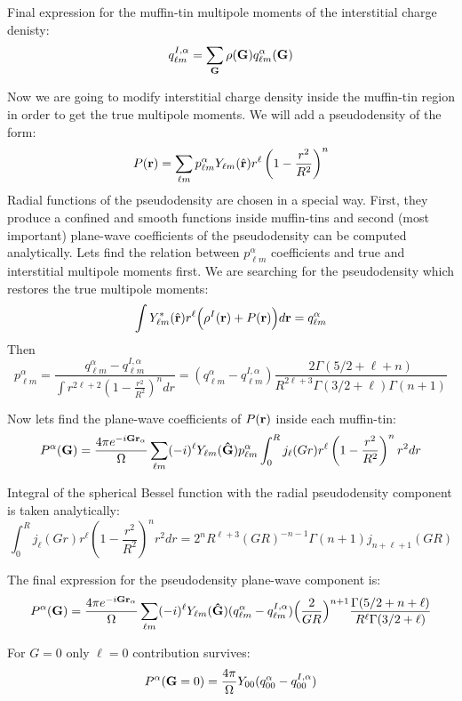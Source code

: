 Final expression for the muffin-\/tin multipole moments of the interstitial charge denisty\+: \[ q_{\ell m}^{I,\alpha} = \sum_{\bf G}\rho({\bf G}) q_{\ell m}^{\alpha}({\bf G}) \]

Now we are going to modify interstitial charge density inside the muffin-\/tin region in order to get the true multipole moments. We will add a pseudodensity of the form\+: \[ P({\bf r}) = \sum_{\ell m} p_{\ell m}^{\alpha} Y_{\ell m}(\hat {\bf r}) r^{\ell} \left(1-\frac{r^2}{R^2}\right)^n \] Radial functions of the pseudodensity are chosen in a special way. First, they produce a confined and smooth functions inside muffin-\/tins and second (most important) plane-\/wave coefficients of the pseudodensity can be computed analytically. Let\textquotesingle{}s find the relation between $ p_{\ell m}^{\alpha} $ coefficients and true and interstitial multipole moments first. We are searching for the pseudodensity which restores the true multipole moments\+: \[ \int Y_{\ell m}^{*}(\hat {\bf r}) r^{\ell} \Big(\rho^{I}({\bf r}) + P({\bf r})\Big) d {\bf r} = q_{\ell m}^{\alpha} \] Then \[ p_{\ell m}^{\alpha} = \frac{q_{\ell m}^{\alpha} - q_{\ell m}^{I,\alpha}} {\int r^{2 \ell + 2} \left(1-\frac{r^2}{R^2}\right)^n dr} = (q_{\ell m}^{\alpha} - q_{\ell m}^{I,\alpha}) \frac{2 \Gamma(5/2 + \ell + n)}{R^{2\ell + 3}\Gamma(3/2 + \ell) \Gamma(n + 1)} \]

Now let\textquotesingle{}s find the plane-\/wave coefficients of $ P({\bf r}) $ inside each muffin-\/tin\+: \[ P^{\alpha}({\bf G}) = \frac{4\pi e^{-i{\bf G r}_{\alpha}}}{\Omega} \sum_{\ell m} (-i)^{\ell} Y_{\ell m}({\bf \hat G}) p_{\ell m}^{\alpha} \int_{0}^{R} j_{\ell}(G r) r^{\ell} \left(1-\frac{r^2}{R^2}\right)^n r^2 dr \]

Integral of the spherical Bessel function with the radial pseudodensity component is taken analytically\+: \[ \int_{0}^{R} j_{\ell}(G r) r^{\ell} \left(1-\frac{r^2}{R^2}\right)^n r^2 dr = 2^n R^{\ell + 3} (GR)^{-n - 1} \Gamma(n + 1) j_{n + \ell + 1}(GR) \]

The final expression for the pseudodensity plane-\/wave component is\+: \[ P^{\alpha}({\bf G}) = \frac{4\pi e^{-i{\bf G r}_{\alpha}}}{\Omega} \sum_{\ell m} (-i)^{\ell} Y_{\ell m}({\bf \hat G}) (q_{\ell m}^{\alpha} - q_{\ell m}^{I,\alpha}) \Big( \frac{2}{GR} \Big)^{n+1} \frac{ \Gamma(5/2 + n + \ell) } {R^{\ell} \Gamma(3/2+\ell)} \]

For $ G=0 $ only $ \ell = 0 $ contribution survives\+: \[ P^{\alpha}({\bf G}=0) = \frac{4\pi}{\Omega} Y_{00} (q_{00}^{\alpha} - q_{00}^{I,\alpha}) \]

